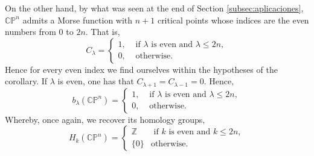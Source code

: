 On the other hand, by what was seen at the end of Section \ref{subsec:aplicaciones}, $\mathbb{CP}^n$ admits a Morse function with $n+1$ critical points whose indices are the even numbers from $0$ to $2n$. That is,
\begin{equation*}
    C_{\lambda}=
    \begin{cases}
        1, &\text{ if } \lambda \text{ is even  and } \lambda\le 2n,\\
        0, &\text{ otherwise.}
    \end{cases}
\end{equation*}
Hence for every even index we find ourselves within the hypotheses of the corollary. If $\lambda$ is even, one has that $C_{\lambda+1}=C_{\lambda-1}=0$. Hence,
\begin{equation*}
    b_{\lambda}(\mathbb{CP}^n)=
    \begin{cases}
        1, &\text{ if } \lambda \text{ is even  and } \lambda\le 2n,\\
        0, &\text{ otherwise.}
    \end{cases}
\end{equation*}
Whereby, once again, we recover its homology groups,
\begin{equation*}
    H_k(\mathbb{CP}^n) =
    \begin{cases}
        \mathbb{Z} &\text{ if } k \text{ is even  and } k\le 2n,\\
        \{0\} &\text{otherwise}.
    \end{cases}
\end{equation*}

